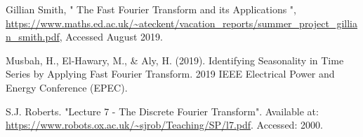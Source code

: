 \documentclass{ieeeojies}
\begin{document}
\begin{thebibliography}{00}
Gillian Smith, " The Fast Fourier Transform and its Applications ", \url{https://www.maths.ed.ac.uk/~ateckent/vacation_reports/summer_project_gillian_smith.pdf}, Accessed August 2019. 



Musbah, H., El-Hawary, M., \& Aly, H. (2019). Identifying Seasonality in
Time Series by Applying Fast Fourier Transform. 2019 IEEE Electrical
Power and Energy Conference (EPEC).

S.J. Roberts. "Lecture 7 - The Discrete Fourier Transform". Available at:
\url{https://www.robots.ox.ac.uk/~sjrob/Teaching/SP/l7.pdf}. Accessed: 2000.


\end{thebibliography}




\EOD
\end{document}
